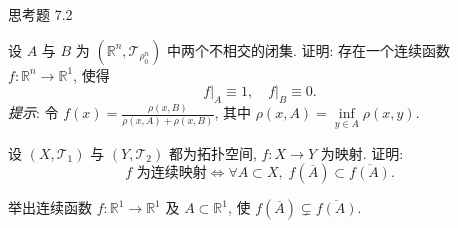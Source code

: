 \begin{exblock}{思考题 7.2}
  \item 设 $A$ 与 $B$ 为 $(\mathbb{R}^{n}, \mathcal{T}_{\rho_{0}^{n}})$ 中两个不相交的闭集. 证明: 存在一个连续函数 $f\colon \mathbb{R}^{n} \to \mathbb{R}^{1}$, 使得
  \[
    f\big|_{A} \equiv 1, \quad f\big|_{B} \equiv 0.
  \]
  \textit{提示}: 令 $f(x) = \frac{\rho(x, B)}{\rho(x, A) + \rho(x, B)}$, 其中 $\rho(x, A) = \inf\limits_{y \in A} \rho(x, y)$.

  \item 设 $(X,\mathcal{T}_{1})$ 与 $(Y,\mathcal{T}_{2})$ 都为拓扑空间, $f\colon X \to Y$ 为映射. 证明:
  \[
    f \text{ 为连续映射} \iff \forall A \subset X, \; f(\overline{A}) \subset \overline{f(A)}.
  \]

  \item 举出连续函数 $f\colon \mathbb{R}^1 \to \mathbb{R}^1$ 及 $A \subset \mathbb{R}^1$, 使 $f(\overline{A}) \subsetneq \overline{f(A)}$.
\end{exblock}